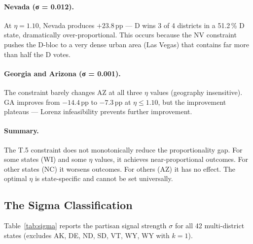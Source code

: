 \paragraph{Nevada (σ = 0.012).}
At $\eta = 1.10$, Nevada produces $+23.8$\,pp --- D wins 3 of 4 districts in
a 51.2\,\% D state, dramatically over-proportional.
This occurs because the NV constraint pushes the D-bloc to a very dense urban
area (Las Vegas) that contains far more than half the D votes.

\paragraph{Georgia and Arizona (σ = 0.001).}
The constraint barely changes AZ at all three $\eta$ values (geography insensitive).
GA improves from $-14.4$\,pp to $-7.3$\,pp at $\eta \leq 1.10$, but the improvement
plateaus --- Lorenz infeasibility prevents further improvement.

\paragraph{Summary.}
The T.5 constraint does not monotonically reduce the proportionality gap.
For some states (WI) and some $\eta$ values, it achieves near-proportional outcomes.
For other states (NC) it worsens outcomes.
For others (AZ) it has no effect.
The optimal $\eta$ is state-specific and cannot be set universally.

\subsection{The Sigma Classification}

Table~\ref{tab:sigma} reports the partisan signal strength $\sigma$ for
all 42 multi-district states (excludes AK, DE, ND, SD, VT, WY, WY with $k=1$).

